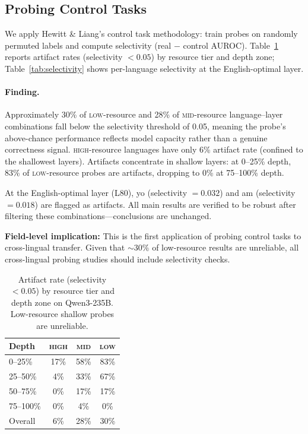 \documentclass[11pt,a4paper]{article}
\newcommand{\auroc}{AUROC}
\begin{document}
\subsection{Probing Control Tasks}
\label{sec:control}

We apply Hewitt \& Liang's \citeyearpar{hewitt2019designing} control task methodology: train probes on randomly permuted labels and compute selectivity (real $-$ control \auroc{}). Table~\ref{tab:artifact} reports artifact rates (selectivity $<0.05$) by resource tier and depth zone; Table~\ref{tab:selectivity} shows per-language selectivity at the English-optimal layer.

\paragraph{Finding.}
Approximately 30\% of \textsc{low}-resource and 28\% of \textsc{mid}-resource language--layer combinations fall below the selectivity threshold of 0.05, meaning the probe's above-chance performance reflects model capacity rather than a genuine correctness signal. \textsc{high}-resource languages have only 6\% artifact rate (confined to the shallowest layers). Artifacts concentrate in shallow layers: at 0--25\% depth, 83\% of \textsc{low}-resource probes are artifacts, dropping to 0\% at 75--100\% depth.

At the English-optimal layer (L80), yo (selectivity $=0.032$) and am (selectivity $=0.018$) are flagged as artifacts. All main results are verified to be robust after filtering these combinations---conclusions are unchanged.

\textbf{Field-level implication:} This is the first application of probing control tasks to cross-lingual transfer. Given that ${\sim}30\%$ of low-resource results are unreliable, all cross-lingual probing studies should include selectivity checks.

\begin{table}[t]
\centering
\small
\begin{tabular}{lccc}
\toprule
Depth & \textsc{high} & \textsc{mid} & \textsc{low} \\
\midrule
0--25\%   & 17\% & 58\% & 83\% \\
25--50\%  & 4\%  & 33\% & 67\% \\
50--75\%  & 0\%  & 17\% & 17\% \\
75--100\% & 0\%  & 4\%  & 0\% \\
\midrule
Overall   & 6\%  & 28\% & 30\% \\
\bottomrule
\end{tabular}
\caption{Artifact rate (selectivity $<0.05$) by resource tier and depth zone on Qwen3-235B. Low-resource shallow probes are unreliable.}
\label{tab:artifact}
\end{table}
\end{document}
